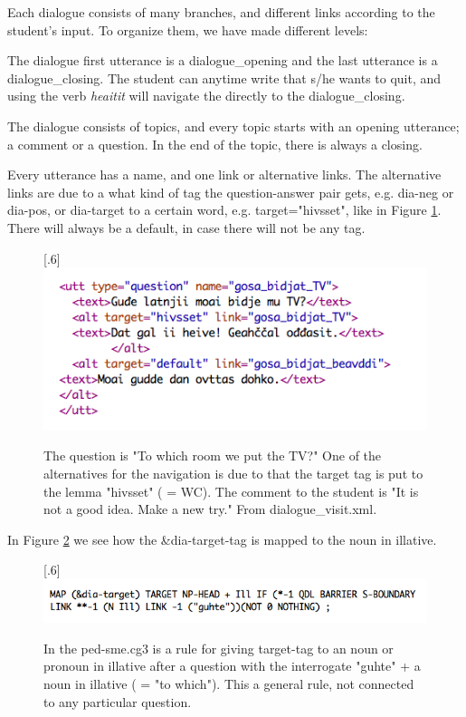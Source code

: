 \documentclass[a4paper,12pt]{article}
\begin{document}
Each dialogue consists of many branches, and different links according to the student's input. To organize them, we have made different levels:

The dialogue first utterance is a dialogue\_opening and the last utterance is a dialogue\_closing. The student can anytime write that s/he wants to quit, and using the verb \textit{heaitit} will navigate the directly to the dialogue\_closing.

The dialogue consists of topics, and every topic starts with an opening utterance; a comment or a question. In the end of the topic, there is always a closing.  

Every utterance has a name, and one link or alternative links. The alternative links are due to a what kind of tag the question-answer pair gets, e.g. dia-neg or dia-pos, or dia-target to a certain word, e.g. target="hivsset", like in Figure \ref{TV}. There will always be a default, in case there will not be any tag.\\

\begin{figure}[htbp]
\begin{center}
\scalebox{.6}[.6]{\includegraphics{img/gosabidjatTV.png}}
\caption{The question is "To which room we put the TV?" One of the alternatives for the navigation is due to that the target tag is put to the lemma "hivsset" ( = WC). The comment to the student is "It is not a good idea. Make a new try." From dialogue\_visit.xml.}
\label{TV}
\end{center}
\end{figure}

In Figure \ref{targetIll} we see how the \&dia-target-tag is mapped to the noun in illative.

\begin{figure}[htbp]
\begin{center}
\scalebox{.6}[.6]{\includegraphics{img/targetIll.png}}
\caption{In the ped-sme.cg3 is a rule for giving target-tag to an noun or pronoun in illative after a question with the interrogate "guhte" + a noun in illative ( = "to which"). This a general rule, not connected to any particular question.}
\label{targetIll}
\end{center}
\end{figure}
\end{document}
